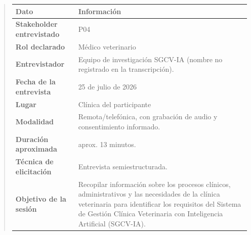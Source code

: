 \documentclass[
]{article}
\newcounter{none} %
\begin{document}
\begin{quote}
{\def\LTcaptype{none} %
\begin{longtable}[]{|
  >{\raggedright\arraybackslash}p{}|
  >{\raggedright\arraybackslash}p{}|}
\hline
\begin{minipage}[b]{\linewidth}\centering
\textbf{Dato}
\end{minipage} & \begin{minipage}[b]{\linewidth}\centering
\textbf{Información}
\end{minipage} \\
\hline
\endhead
\hline
\endlastfoot
\textbf{Stakeholder entrevistado} & \begin{minipage}[t]{\linewidth}\raggedright
P04
\end{minipage} \\
\hline
\textbf{Rol declarado} & \begin{minipage}[t]{\linewidth}\raggedright
Médico veterinario
\end{minipage} \\
\hline
\textbf{Entrevistador} & \begin{minipage}[t]{\linewidth}\raggedright
Equipo de investigación SGCV-IA (nombre no registrado en la transcripción).
\end{minipage} \\
\hline
\textbf{Fecha de la entrevista} & \begin{minipage}[t]{\linewidth}\raggedright
25 de julio de 2026
\end{minipage} \\
\hline
\textbf{Lugar} & \begin{minipage}[t]{\linewidth}\raggedright
Clínica del participante
\end{minipage} \\
\hline
\textbf{Modalidad} & \begin{minipage}[t]{\linewidth}\raggedright
Remota/telefónica, con grabación de audio y consentimiento informado.
\end{minipage} \\
\hline
\textbf{Duración aproximada} & \begin{minipage}[t]{\linewidth}\raggedright
aprox. 13 minutos.
\end{minipage} \\
\hline
\textbf{Técnica de elicitación} & \begin{minipage}[t]{\linewidth}\raggedright
Entrevista semiestructurada.
\end{minipage} \\
\hline
\textbf{Objetivo de la sesión} & \begin{minipage}[t]{\linewidth}\raggedright
Recopilar información sobre los procesos clínicos, administrativos y las necesidades de la clínica veterinaria para identificar los requisitos del Sistema de Gestión Clínica Veterinaria con Inteligencia Artificial (SGCV-IA).
\end{minipage} \\
\hline
\end{longtable}
}


\end{quote}
\end{document}
